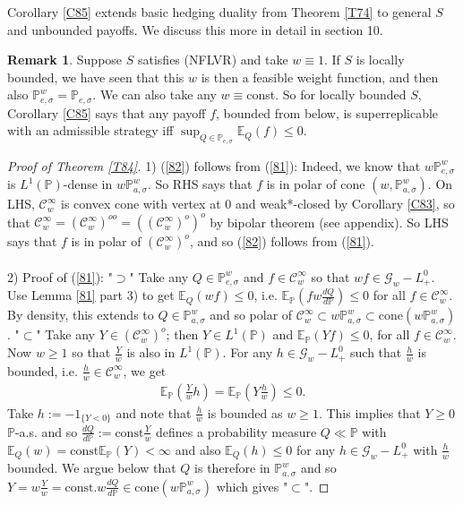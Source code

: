 \documentclass[12pt,a4paper, twoside]{article}
\theoremstyle{definition}
\newtheorem{rem}{Remark}[section]
\newcommand{\EE}{\mathbb{E}} %
\newcommand{\PP}{\mathbb{P}} %
\begin{document}
Corollary \ref{C85} extends basic hedging duality from Theorem \ref{T74} to general $S$ and unbounded payoffs. We discuss this more in detail in section 10. 
\begin{rem} Suppose $S$ satisfies (NFLVR) and take $w \equiv 1$. If $S$ is locally bounded,  we have seen that this $w$ is then a feasible weight function, and then also $\PP_{e, \sigma}^w = \PP_{e, \sigma}$. We can also take any $w \equiv$const. So for locally bounded $S$, Corollary \ref{C85} says that any payoff $f$, bounded from below,  is superreplicable with an admissible strategy iff $\sup_{Q \in \PP_{e, \sigma}} \EE_Q(f) \leq 0$. 
\end{rem}
\begin{proof}[Proof of Theorem \ref{T84}] 1) (\ref{82}) follows from (\ref{81}): Indeed, we know that $w \PP_{e, \sigma}^w$ is $L^1(\PP)$-dense in $w\PP_{a, \sigma}^w$. So RHS says that $f$ is in polar of cone $(w, \PP_{a, \sigma}^w)$. On LHS, $\mathcal{C}_w^\infty$ is convex cone with vertex at $0$ and weak*-closed by Corollary \ref{C83}, so that $\mathcal{C}_w^\infty = ( \mathcal{C}_w^\infty)^{oo} = ( ( \mathcal{C}_w^\infty)^o)^o$ by bipolar theorem (see appendix). So LHS says that $f$ is in polar of $( \mathcal{C}_w^\infty)^o$, and so (\ref{82}) follows from (\ref{81}). 
\\
\\
2) Proof of (\ref{81}): "$\supset$" Take any $Q \in \mathbb{P}_{e, \sigma}^w$ and $f \in \mathcal{C}_w^\infty$ so that $w f \in \mathcal{G}_w-L_+^0$. Use Lemma \ref{81} part 3) to get $\EE_Q(wf) \leq 0$, i.e. $\EE_\PP(fw \frac{dQ}{d \PP}) \leq 0 $ for all $f \in \mathcal{C}_w^\infty$. By density, this extends to $Q \in \PP_{a, \sigma}^w$ and so polar of $\mathcal{C}_w^\infty \subset w \PP_{a, \sigma}^w \subset \text{cone}(w \PP_{a, \sigma}^w)$. 
\newpage
 "$\subset$" Take any $Y \in ( \mathcal{C}_w^\infty)^o$; then $Y \in L^1 ( \PP)$ and $\EE_\PP(Yf) \leq 0$, for all $f \in \mathcal{C}_w^\infty$. Now $w \geq 1$ so that $\frac{Y}{w}$ is also in $L^1( \PP)$. For any $h \in \mathcal{G}_w-L_+^0$ such that $\frac{h}{w}$ is bounded, i.e. $\frac{h}{w} \in \mathcal{C}_w^\infty$, we get 
\begin{align*}
\EE_\PP\left( \frac{Y}{w}h \right) = \EE_\PP  \left( Y\frac{h}{w} \right) \leq 0. 
\end{align*}
Take $h := -1_{\{ Y < 0\}}$ and note that $\frac{h}{w}$ is bounded as $w \geq 1$. This implies that $Y \geq 0$ $\PP$-a.s. and so $\frac{dQ}{d\PP}:= \text{const} \frac{Y}{w}$ defines a probability measure $Q \ll \PP$ with $\EE_Q(w) = \text{const} \EE_\PP(Y) < \infty$ and also $\EE_Q(h) \leq 0$ for any $h \in \mathcal{G}_w -L_+^0$ with $\frac{h}{w}$ bounded. We argue below that $Q$ is therefore in $\PP_{a,\sigma}^w$ and so $Y= w \frac{Y}{w}= \text{const.}w \frac{dQ}{d\PP} \in \text{cone}(w \PP_{a, \sigma}^w)$ which gives "$\subset$". 

\end{proof}
\end{document}
